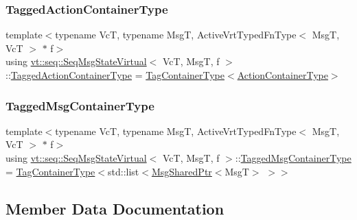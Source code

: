\subsubsection{\texorpdfstring{Tagged\+Action\+Container\+Type}{TaggedActionContainerType}}
{\footnotesize\ttfamily template$<$typename VcT, typename MsgT, Active\+Vrt\+Typed\+Fn\+Type$<$ Msg\+T, Vc\+T $>$ $\ast$ f$>$ \\
using \hyperlink{structvt_1_1seq_1_1_seq_msg_state_virtual}{vt\+::seq\+::\+Seq\+Msg\+State\+Virtual}$<$ VcT, MsgT, f $>$\+::\hyperlink{structvt_1_1seq_1_1_seq_msg_state_virtual_a1298c226eeddc2e8fbd58bf1b92ef2aa}{Tagged\+Action\+Container\+Type} =  \hyperlink{structvt_1_1seq_1_1_seq_msg_state_virtual_a64d396aacb60dcc361f846d807bd074a}{Tag\+Container\+Type}$<$\hyperlink{structvt_1_1seq_1_1_seq_msg_state_virtual_aa60e119bc842980c949be50663b04b7a}{Action\+Container\+Type}$>$}

\mbox{\label{structvt_1_1seq_1_1_seq_msg_state_virtual_a9760353cffc9071f3e24054562a86db3}} 
\subsubsection{\texorpdfstring{Tagged\+Msg\+Container\+Type}{TaggedMsgContainerType}}
{\footnotesize\ttfamily template$<$typename VcT, typename MsgT, Active\+Vrt\+Typed\+Fn\+Type$<$ Msg\+T, Vc\+T $>$ $\ast$ f$>$ \\
using \hyperlink{structvt_1_1seq_1_1_seq_msg_state_virtual}{vt\+::seq\+::\+Seq\+Msg\+State\+Virtual}$<$ VcT, MsgT, f $>$\+::\hyperlink{structvt_1_1seq_1_1_seq_msg_state_virtual_a9760353cffc9071f3e24054562a86db3}{Tagged\+Msg\+Container\+Type} =  \hyperlink{structvt_1_1seq_1_1_seq_msg_state_virtual_a64d396aacb60dcc361f846d807bd074a}{Tag\+Container\+Type}$<$std\+::list$<$\hyperlink{namespacevt_ab2b3d506ec8e8d1540aede826d84a239}{Msg\+Shared\+Ptr}$<$MsgT$>$ $>$$>$}



\subsection{Member Data Documentation}
\mbox{\label{structvt_1_1seq_1_1_seq_msg_state_virtual_ae0a3ff39e7edb7e47ffaae528823e76c}} 
